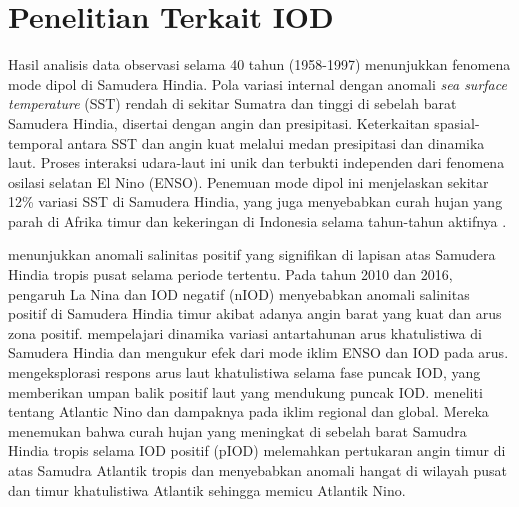 \vspace{1.5pc}
\vspace{-1pc}
\section[Penelitian Terkait IOD]{Penelitian Terkait IOD}
\begin{spacing}{1.5}
	Hasil analisis data observasi selama 40 tahun (1958-1997) menunjukkan fenomena mode dipol di Samudera Hindia. Pola variasi internal dengan anomali \textit{sea surface temperature} (SST) rendah di sekitar Sumatra dan tinggi di sebelah barat Samudera Hindia, disertai dengan angin dan presipitasi. Keterkaitan spasial-temporal antara SST dan angin kuat melalui medan presipitasi dan dinamika laut. Proses interaksi udara-laut ini unik dan terbukti independen dari fenomena osilasi selatan El Nino (ENSO). Penemuan mode dipol ini menjelaskan sekitar 12\% variasi SST di Samudera Hindia, yang juga menyebabkan curah hujan yang parah di Afrika timur dan kekeringan di Indonesia selama tahun-tahun aktifnya \cite{Saji1999}.
	
	 menunjukkan anomali salinitas positif yang signifikan di lapisan atas Samudera Hindia tropis pusat selama periode tertentu. Pada tahun 2010 dan 2016, pengaruh La Nina dan IOD negatif (nIOD) menyebabkan anomali salinitas positif di Samudera Hindia timur akibat adanya angin barat yang kuat dan arus zona positif.  mempelajari dinamika variasi antartahunan arus khatulistiwa di Samudera Hindia dan mengukur efek dari mode iklim ENSO dan IOD pada arus.  mengeksplorasi respons arus laut khatulistiwa selama fase puncak IOD, yang memberikan umpan balik positif laut yang mendukung puncak IOD.  meneliti tentang Atlantic Nino dan dampaknya pada iklim regional dan global. Mereka menemukan bahwa curah hujan yang meningkat di sebelah barat Samudra Hindia tropis selama IOD positif (pIOD) melemahkan pertukaran angin timur di atas Samudra Atlantik tropis dan menyebabkan anomali hangat di wilayah pusat dan timur khatulistiwa Atlantik sehingga memicu Atlantik Nino.
	

\end{spacing}
